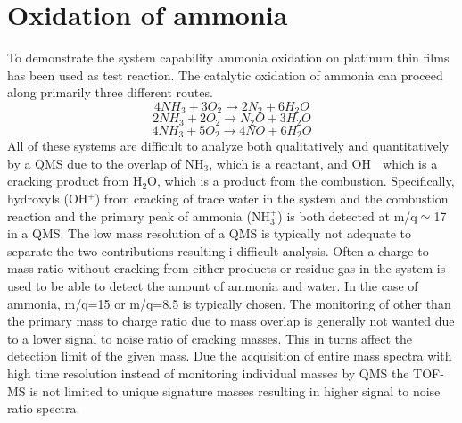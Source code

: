\documentclass[aip,rsi]{revtex4-1}
\begin{document}
\section{Oxidation of ammonia}
To demonstrate the system capability ammonia oxidation on platinum thin films has been used as test reaction. The catalytic oxidation of ammonia can proceed along primarily three different routes.
\begin{equation}
4NH_3+3O_2\rightarrow 2N_2 + 6H_2O
\label{eq:Pt_clean_combustion}
\end{equation}
\begin{equation}
2NH_3+2O_2\rightarrow N_2O + 3H_2O
\end{equation}
\begin{equation}
4NH_3+5O_2\rightarrow 4NO + 6H_2O
\end{equation}
All of these systems are difficult to analyze both qualitatively and quantitatively by a QMS due to the overlap of NH$_3$, which is a reactant, and OH$^-$ which is a cracking product from H$_2$O, which is a product from the combustion. Specifically, hydroxyls (OH$^{+}$) from cracking of trace water in the system and the combustion reaction and the primary peak of ammonia (NH$_{3}^{+}$) is both detected at m/q$\simeq$17 in a QMS. The low mass resolution of a QMS is typically not adequate to separate the two contributions resulting i difficult analysis. Often a charge to mass ratio without cracking from either products or residue gas in the system is used to be able to detect the amount of ammonia and water. In the case of ammonia, m/q=15 or m/q=8.5 is typically chosen. The monitoring of other than the primary mass to charge ratio due to mass overlap is generally not wanted due to a lower signal to noise ratio of cracking masses. This in turns affect the detection limit of the given mass. Due the acquisition of entire mass spectra with high time resolution instead of monitoring individual masses by QMS the TOF-MS is not limited to unique signature masses resulting in higher signal to noise ratio spectra.
\end{document}
